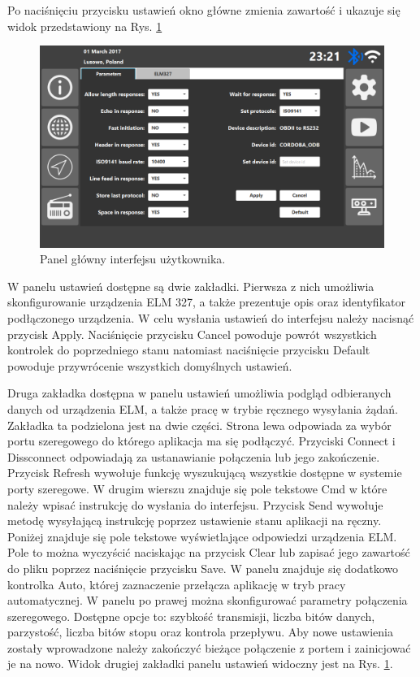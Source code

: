 \documentclass[12pt, twoside]{article} %
\numberwithin{equation}{subsection}
\numberwithin{figure}{section}
\numberwithin{table}{section}
\begin{document}
		Po naciśnięciu przycisku ustawień okno główne zmienia zawartość i ukazuje się widok przedstawiony na Rys. \ref{user_interface_dashboard}
		
		\begin{figure}[!h]
			\centering
			\includegraphics[scale=0.55]{Images/user_interface_settings_parameters_tab.png}
			\caption{Panel główny interfejsu użytkownika.}
			\label{user_interface_dashboard}
		\end{figure}		
		
		W panelu ustawień dostępne są dwie zakładki. Pierwsza z nich umożliwia skonfigurowanie urządzenia ELM 327, a także prezentuje opis oraz identyfikator podłączonego urządzenia. W celu wysłania ustawień do interfejsu należy nacisnąć przycisk Apply. Naciśnięcie przycisku Cancel powoduje powrót wszystkich kontrolek do poprzedniego stanu natomiast naciśnięcie przycisku Default powoduje przywrócenie wszystkich domyślnych ustawień.
		
		\newpage
		
		Druga zakładka dostępna w panelu ustawień umożliwia podgląd odbieranych danych od urządzenia ELM, a także pracę w trybie ręcznego wysyłania żądań. Zakładka ta podzielona jest na dwie części. Strona lewa odpowiada za wybór portu szeregowego do którego aplikacja ma się podłączyć. Przyciski Connect i Dissconnect odpowiadają za ustanawianie połączenia lub jego zakończenie. Przycisk Refresh wywołuje funkcję wyszukującą wszystkie dostępne w systemie porty szeregowe. W drugim wierszu znajduje się pole tekstowe Cmd w które należy wpisać instrukcję do wysłania do interfejsu. Przycisk Send wywołuje metodę wysyłającą instrukcję poprzez ustawienie stanu aplikacji na ręczny. Poniżej znajduje się pole tekstowe wyświetlające odpowiedzi urządzenia ELM. Pole to można wyczyścić naciskając na przycisk Clear lub zapisać jego zawartość do pliku poprzez naciśnięcie przycisku Save. W panelu znajduje się dodatkowo kontrolka Auto, której zaznaczenie przełącza aplikację w tryb pracy automatycznej. W panelu po prawej można skonfigurować parametry połączenia szeregowego. Dostępne opcje to: szybkość transmisji, liczba bitów danych, parzystość, liczba bitów stopu oraz kontrola przepływu. Aby nowe ustawienia zostały wprowadzone należy zakończyć bieżące połączenie z portem i zainicjować je na nowo. Widok drugiej zakładki panelu ustawień widoczny jest na Rys. \ref{user_interface_dashboard}.
		
\end{document}
